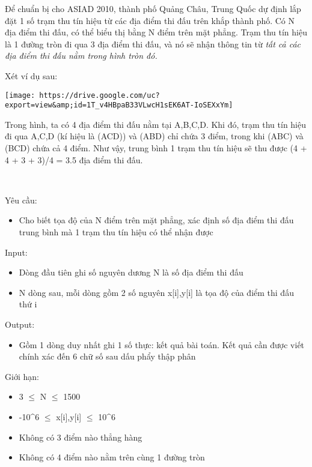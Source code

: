 

Để chuẩn bị cho ASIAD 2010, thành phố Quảng Châu, Trung Quốc dự định lắp đặt 1 số trạm thu tín hiệu từ các địa điểm thi đấu trên khắp thành phố. Có N địa điểm thi đấu, có thể biểu thị bằng N điểm trên mặt phẳng. Trạm thu tín hiệu là 1 đường tròn đi qua 3 địa điểm thi đấu, và nó sẽ nhận thông tin từ \emph{ tất cả các địa điểm thi đấu nằm trong hình tròn đó. }

Xét ví dụ sau:


\texttt{[image: https://drive.google.com/uc?export=view\&amp;id=1T\_v4HBpaB33VLwcH1sEK6AT-IoSEXxYm]}

Trong hình, ta có 4 địa điểm thi đấu nằm tại A,B,C,D. Khi đó, trạm thu tín hiệu đi qua A,C,D (kí hiệu là (ACD)) và (ABD) chỉ chứa 3 điểm, trong khi (ABC) và (BCD) chứa cả 4 điểm. Như vậy, trung bình 1 trạm thu tín hiệu sẽ thu được (4 + 4 + 3 + 3)/4 = 3.5 địa điểm thi đấu.

 

Yêu cầu:
\begin{itemize}
	\item 

Cho biết tọa độ của N điểm trên mặt phẳng, xác định số địa điểm thi đấu trung bình mà 1 trạm thu tín hiệu có thể nhận được
\end{itemize}

Input:
\begin{itemize}
	\item 

Dòng đầu tiên ghi số nguyên dương N là số địa điểm thi đấu
	\item 

N dòng sau, mỗi dòng gồm 2 số nguyên x[i],y[i] là tọa độ của điểm thi đấu thứ i
\end{itemize}

Output:
\begin{itemize}
	\item 

Gồm 1 dòng duy nhất ghi 1 số thực: kết quả bài toán. Kết quả cần được viết chính xác đến 6 chữ số sau dấu phẩy thập phân
\end{itemize}

Giới hạn:
\begin{itemize}
	\item 

3  $\le$  N  $\le$  1500
	\item 

-10^6  $\le$  x[i],y[i]  $\le$  10^6
	\item 

Không có 3 điểm nào thẳng hàng
	\item 

Không có 4 điểm nào nằm trên cùng 1 đường tròn
\end{itemize}

